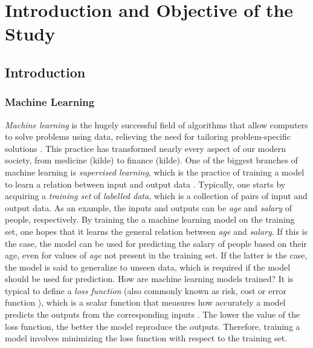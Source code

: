 \chapter{Introduction and Objective of the Study}

\section{Introduction}\label{sec:Introduction}

\subsection{Machine Learning}\label{sec:Machine Learning Intro}


\emph{Machine learning} is the hugely successful field of algorithms that allow computers to solve problems using data, relieving the need for tailoring problem-specific solutions \cite{SupervisedwquantumComputers}. This practice has transformed nearly every aspect of our modern society, from medicine (kilde) to finance (kilde). One of the biggest branches of machine learning is \emph{supervised learning}, which is the practice of training a model to learn a relation between input and output data \cite{hastie01statisticallearning}. Typically, one starts by acquiring a \emph{training set} of \emph{labelled data}, which is a collection of pairs of input and output data. As an example, the inputs and outputs can be \emph{age} and \emph{salary} of people, respectively. By training the a machine learning model on the training set, one hopes that it learns the general relation between \emph{age} and \emph{salary}. If this is the case, the model can be used for predicting the salary of people based on their age, even for values of \emph{age} not present in the training set. If the latter is the case, the model is said to generalize to unseen data, which is required if the model should be used for prediction. How are machine learning models trained? It is typical to define a \emph{loss function} (also commonly known as risk, cost or error function \citet{}), which is a scalar function that measures how accurately a model predicts the outputs from the corresponding inputs \cite{hastie01statisticallearning}. The lower the value of the loss function, the better the model reproduce the outputs. Therefore, training a model involves minimizing the loss function with respect to the training set.


